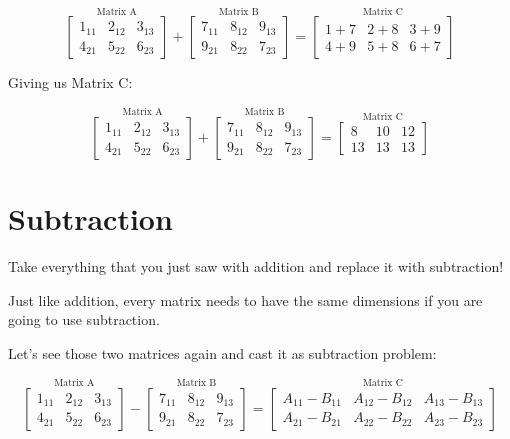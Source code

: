 \documentclass[
  letterpaper,
]{krantz}
\begin{document}
\[
\stackrel{\mbox{Matrix A}}{
\begin{bmatrix}
1_{11} & 2_{12} & 3_{13}\\
4_{21} & 5_{22} & 6_{23}
\end{bmatrix}
}  
+ 
\stackrel{\mbox{Matrix B}}{
\begin{bmatrix}
7_{11} & 8_{12} & 9_{13}\\
9_{21} & 8_{22} & 7_{23}
\end{bmatrix} 
}
=
\stackrel{\mbox{Matrix C}}{
\begin{bmatrix}
1 + 7  & 2 + 8 & 3 + 9\\
4 + 9 & 5 + 8 & 6 + 7
\end{bmatrix}
}
\]

Giving us Matrix C:

\[
\stackrel{\mbox{Matrix A}}{
\begin{bmatrix}
1_{11} & 2_{12} & 3_{13}\\
4_{21} & 5_{22} & 6_{23}
\end{bmatrix}
}  
+ 
\stackrel{\mbox{Matrix B}}{
\begin{bmatrix}
7_{11} & 8_{12} & 9_{13}\\
9_{21} & 8_{22} & 7_{23}
\end{bmatrix} 
}
=
\stackrel{\mbox{Matrix C}}{
\begin{bmatrix}
8 & 10 & 12 \\
13 & 13 & 13
\end{bmatrix}
}
\]

\section{Subtraction}\label{subtraction}

Take everything that you just saw with addition and replace it with
subtraction!

Just like addition, every matrix needs to have the same dimensions if
you are going to use subtraction.

Let's see those two matrices again and cast it as subtraction problem:

\[
\stackrel{\mbox{Matrix A}}{
\begin{bmatrix}
1_{11} & 2_{12} & 3_{13}\\
4_{21} & 5_{22} & 6_{23}
\end{bmatrix}
}
-
\stackrel{\mbox{Matrix B}}{
\begin{bmatrix}
7_{11} & 8_{12} & 9_{13}\\
9_{21} & 8_{22} & 7_{23}
\end{bmatrix} 
}
=
\stackrel{\mbox{Matrix C}}{
\begin{bmatrix}
A_{11} - B_{11}& A_{12} - B_{12} & A_{13} - B_{13}\\
A_{21} - B_{21}& A_{22} - B_{22} & A_{23} - B_{23}
\end{bmatrix}
}
\]
\end{document}
